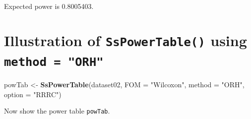 \documentclass[
]{book}
\newenvironment{Shaded}{\begin{snugshade}}{\end{snugshade}}
\newcommand{\DataTypeTok}[1]{\textcolor[rgb]{0.13,0.29,0.53}{#1}}
\newcommand{\KeywordTok}[1]{\textcolor[rgb]{0.13,0.29,0.53}{\textbf{#1}}}
\newcommand{\NormalTok}[1]{#1}
\newcommand{\StringTok}[1]{\textcolor[rgb]{0.31,0.60,0.02}{#1}}
\begin{document}
Expected power is 0.8005403.

\hypertarget{illustration-of-sspowertable-using-method-orh}{%
\section{\texorpdfstring{Illustration of \texttt{SsPowerTable()} using \texttt{method\ =\ "ORH"}}{Illustration of SsPowerTable() using method = "ORH"}}\label{illustration-of-sspowertable-using-method-orh}}

\begin{Shaded}
\begin{Highlighting}[]
\NormalTok{powTab \textless{}{-}}\StringTok{ }\KeywordTok{SsPowerTable}\NormalTok{(dataset02, }\DataTypeTok{FOM =} \StringTok{"Wilcoxon"}\NormalTok{, }\DataTypeTok{method =} \StringTok{"ORH"}\NormalTok{, }\DataTypeTok{option =} \StringTok{"RRRC"}\NormalTok{)}
\end{Highlighting}
\end{Shaded}

Now show the power table \texttt{powTab}.
\end{document}
